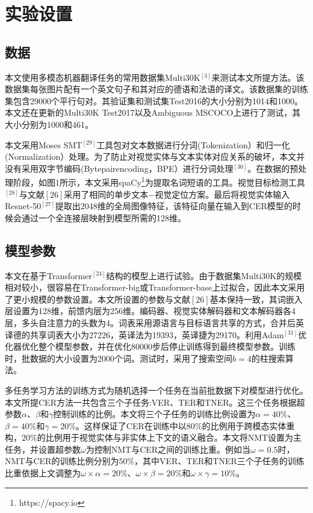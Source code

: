 \section{实验设置}

\subsection{数据}

本文使用多模态机器翻译任务的常用数据集Multi30K$^{[3]}$来测试本文所提方法。该数据集每张图片配有一个英文句子和其对应的德语和法语的译文。该数据集的训练集包含29000个平行句对。其验证集和测试集Test2016的大小分别为1014和1000。本文还在更新的Multi30K Test2017以及Ambiguous MSCOCO上进行了测试，其大小分别为1000和461。

本文采用Moses SMT$^{[29]}$工具包对文本数据进行分词(Tokenization）和归一化(Normalization）处理。为了防止对视觉实体与文本实体对应关系的破坏，本文并没有采用双字节编码(Bytepairencoding，BPE）进行分词处理$^{[30]}$。在数据的预处理阶段，如图1所示，本文采用spaCy\footnote{https://spacy.io}为提取名词短语的工具。视觉目标检测工具$^{[28]}$与文献${[26]}$采用了相同的单步文本$-$视觉定位方案。最后将视觉实体输入Resnet-50$^{[27]}$提取出2048维的全局图像特征，该特征向量在输入到CER模型的时候会通过一个全连接层映射到模型所需的128维。

\subsection{模型参数}
本文在基于Transformer$^{[24]}$结构的模型上进行试验。由于数据集Multi30K的规模相对较小，很容易在Transformer-big或Transformer-base上过拟合，因此本文采用了更小规模的参数设置。本文所设置的参数与文献${[26]}$基本保持一致，其词嵌入层设置为128维，前馈内层为256维。编码器、视觉实体解码器和文本解码器各4层，多头自注意力的头数为4。词表采用源语言与目标语言共享的方式，合并后英译德的共享词表大小为27226，英译法为19393，英译捷为29170。利用Adam$^{[31]}$优化器优化整个模型参数，并在优化80000步后停止训练得到最终模型参数。训练时，批数据的大小设置为2000个词。测试时，采用了搜索空间$b=4$的柱搜索算法。

多任务学习方法的训练方式为随机选择一个任务在当前批数据下对模型进行优化。本文所提CER方法一共包含三个子任务:VER、TER和TNER。这三个任务根据超参数$\alpha$、$\beta$和$\gamma$控制训练的比例。本文将三个子任务的训练比例设置为$\alpha=40\%$、$\beta=40\%$和$\gamma=20\%$。这样保证了CER在训练中以$80\%$的比例用于跨模态实体重构，$20\%$的比例用于视觉实体与非实体上下文的语义融合。本文将NMT设置为主任务，并设置超参数$\omega$为控制NMT与CER之间的训练比重。例如当$\omega=0.5$时，NMT与CER的训练比例分别为$50\%$，其中VER、TER和TNER三个子任务的训练比重依据上文调整为$\omega\times\alpha=20\%$、$\omega\times\beta=20\%$和$\omega\times\gamma=10\%$。

